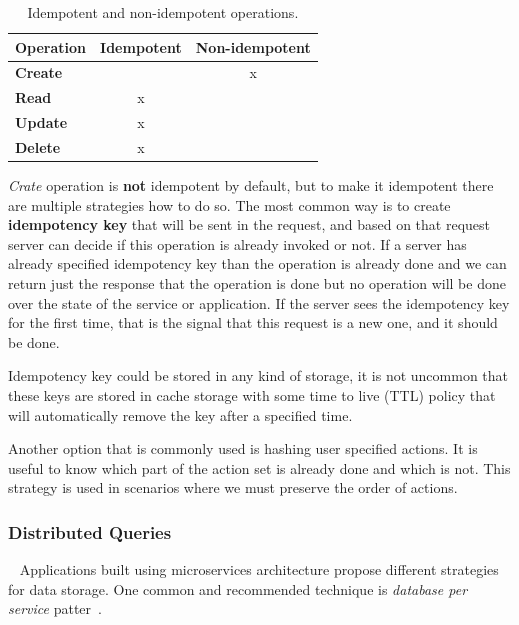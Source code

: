 \begin{table}[h!]
	\begin{center}
		\begin{tabular}{l|c|c}
			\textbf{Operation} & \textbf{Idempotent} & \textbf{Non-idempotent}\\
			\hline
			\textbf{Create} &  & x \\
			\textbf{Read} & x & \\
			\textbf{Update} & x & \\
			\textbf{Delete} & x & \\
		\end{tabular}
	\end{center}
	\vspace{-0.5cm}
	\caption{Idempotent and non-idempotent operations.}
	\label{tab:table8}
\end{table}

\noindent
\emph{Crate} operation is \textbf{not} idempotent by default, but to make it idempotent there are multiple strategies how to do so. The most common way is to create \textbf{idempotency key} that will be sent in the request, and based on that request server can decide if this operation is already invoked or not. If a server has already  specified idempotency key than the operation is already done and we can return just the response that the operation is done but no operation will be done over the state of the service or application. If the server sees the idempotency key for the first time, that is the signal that this request is a new one, and it should be done.

Idempotency key could be stored in any kind of storage, it is not uncommon that these keys are stored in cache storage with some time to live (TTL) policy that will automatically remove the key after a specified time.

Another option that is commonly used is hashing user specified actions. It is useful to know which part of the action set is already done and which is not. This strategy is used in scenarios where we must preserve the order of actions.
%
%
\subsubsection{Distributed Queries}~\label{sec:distributed_queries}
%
Applications built using microservices architecture propose different strategies for data storage. One common and recommended technique is \emph{database per service} patter~\cite{richardson2018microservices}.

